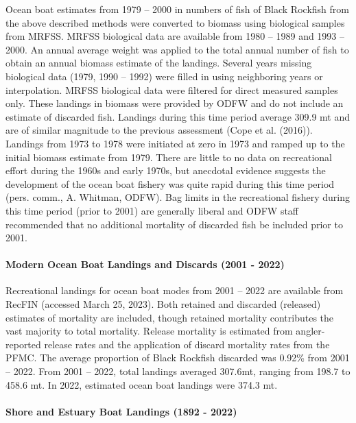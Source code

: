 \documentclass[11pt,
  letterpaper,
]{article}
\begin{document}
Ocean boat estimates from 1979 -- 2000 in numbers of fish of Black Rockfish from the above described methods were converted to biomass using biological samples from MRFSS. MRFSS biological data are available from 1980 -- 1989 and 1993 -- 2000. An annual average weight was applied to the total annual number of fish to obtain an annual biomass estimate of the landings. Several years missing biological data (1979, 1990 -- 1992) were filled in using neighboring years or interpolation. MRFSS biological data were filtered for direct measured samples only. These landings in biomass were provided by ODFW and do not include an estimate of discarded fish. Landings during this time period average 309.9 mt and are of similar magnitude to the previous assessment (Cope et al. (2016)). Landings from 1973 to 1978 were initiated at zero in 1973 and ramped up to the initial biomass estimate from 1979. There are little to no data on recreational effort during the 1960s and early 1970s, but anecdotal evidence suggests the development of the ocean boat fishery was quite rapid during this time period (pers. comm., A. Whitman, ODFW). Bag limits in the recreational fishery during this time period (prior to 2001) are generally liberal and ODFW staff recommended that no additional mortality of discarded fish be included prior to 2001.

\hypertarget{modern-ocean-boat-landings-and-discards-2001---2022}{%
\paragraph{Modern Ocean Boat Landings and Discards (2001 - 2022)}\label{modern-ocean-boat-landings-and-discards-2001---2022}}

Recreational landings for ocean boat modes from 2001 -- 2022 are available from RecFIN (accessed March 25, 2023). Both retained and discarded (released) estimates of mortality are included, though retained mortality contributes the vast majority to total mortality. Release mortality is estimated from angler-reported release rates and the application of discard mortality rates from the PFMC. The average proportion of Black Rockfish discarded was 0.92\% from 2001 -- 2022. From 2001 -- 2022, total landings averaged 307.6mt, ranging from 198.7 to 458.6 mt. In 2022, estimated ocean boat landings were 374.3 mt.

\hypertarget{shore-and-estuary-boat-landings-1892---2022}{%
\paragraph{Shore and Estuary Boat Landings (1892 - 2022)}\label{shore-and-estuary-boat-landings-1892---2022}}
\end{document}
